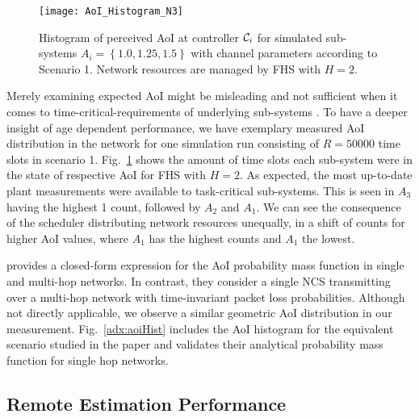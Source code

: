 \begin{figure}[htb]
  \centering
  \texttt{[image: AoI\_Histogram\_N3]}
  \caption[Scenario 1: Measurement of AoI distribution]{Histogram of perceived
  AoI at controller $\mathcal{C}_i$ for simulated sub-systems $A_i=\left\{1.0,
  1.25, 1.5\right\}$ with channel parameters according to Scenario 1. Network
  resources are managed by FHS with $H=2$.} 
  \label{fig:AoIHist}
\end{figure}

Merely examining expected AoI might be misleading and not sufficient when it
comes to time-critical-requirements of underlying sub-systems
\cite{ayan2020probability}. To have a deeper insight of age dependent
performance, we have exemplary measured AoI distribution in the network for one
simulation run consisting of $R=50000$ time slots in scenario 1.
Fig.~\ref{fig:AoIHist} shows the amount of time slots each sub-system were in
the state of respective AoI for FHS with $H=2$. As expected, the most up-to-date
plant measurements were available to task-critical sub-systems. This is seen in
$A_3$ having the highest 1 count, followed by $A_2$ and $A_1$. We can see the
consequence of the scheduler distributing network resources unequally, in a
shift of counts for higher AoI values, where $A_1$ has the highest counts and
$A_1$ the lowest.
  
\cite{ayan2020probability} provides a closed-form expression for the AoI
probability mass function in single and multi-hop networks. In contrast, they
consider a single NCS transmitting over a multi-hop network with time-invariant
packet loss probabilities. Although not directly applicable, we observe a
similar geometric AoI distribution in our measurement. Fig.~\ref{adx:aoiHist}
includes the AoI histogram for the equivalent scenario studied in the paper and
validates their analytical probability mass function for single hop networks.

\subsection{Remote Estimation Performance}

